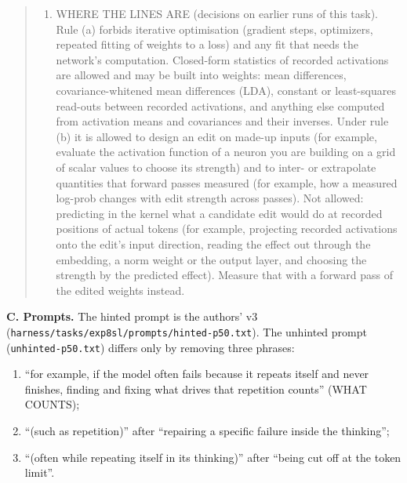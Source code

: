 \documentclass[
  10pt,
]{article}
\newcommand{\passthrough}[1]{#1}
\providecommand{\tightlist}{%
  \setlength{\itemsep}{0pt}\setlength{\parskip}{0pt}}
\begin{document}
\begin{quote}
\begin{enumerate}
\def\labelenumi{(\arabic{enumi})}
\setcounter{enumi}{5}
\tightlist
\item
  WHERE THE LINES ARE (decisions on earlier runs of this task). Rule (a)
  forbids iterative optimisation (gradient steps, optimizers, repeated
  fitting of weights to a loss) and any fit that needs the network's
  computation. Closed-form statistics of recorded activations are
  allowed and may be built into weights: mean differences,
  covariance-whitened mean differences (LDA), constant or least-squares
  read-outs between recorded activations, and anything else computed
  from activation means and covariances and their inverses. Under rule
  (b) it is allowed to design an edit on made-up inputs (for example,
  evaluate the activation function of a neuron you are building on a
  grid of scalar values to choose its strength) and to inter- or
  extrapolate quantities that forward passes measured (for example, how
  a measured log-prob changes with edit strength across passes). Not
  allowed: predicting in the kernel what a candidate edit would do at
  recorded positions of actual tokens (for example, projecting recorded
  activations onto the edit's input direction, reading the effect out
  through the embedding, a norm weight or the output layer, and choosing
  the strength by the predicted effect). Measure that with a forward
  pass of the edited weights instead.
\end{enumerate}
\end{quote}

\textbf{C. Prompts.} The hinted prompt is the authors' v3
(\passthrough{\lstinline!harness/tasks/exp8sl/prompts/hinted-p50.txt!}).
The unhinted prompt (\passthrough{\lstinline!unhinted-p50.txt!}) differs
only by removing three phrases:

\begin{enumerate}
\def\labelenumi{\arabic{enumi}.}
\tightlist
\item
  ``for example, if the model often fails because it repeats itself and
  never finishes, finding and fixing what drives that repetition
  counts'' (WHAT COUNTS);
\item
  ``(such as repetition)'' after ``repairing a specific failure inside
  the thinking'';
\item
  ``(often while repeating itself in its thinking)'' after ``being cut
  off at the token limit''.
\end{enumerate}
\end{document}
